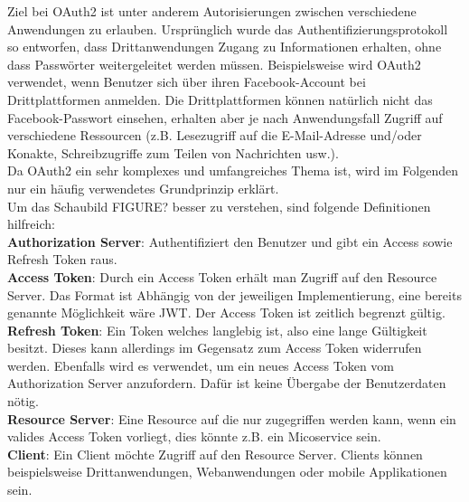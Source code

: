 Ziel bei OAuth2 ist unter anderem Autorisierungen zwischen verschiedene Anwendungen zu erlauben. Ursprünglich wurde das Authentifizierungsprotokoll so entworfen, dass Drittanwendungen Zugang zu Informationen erhalten, ohne dass Passwörter weitergeleitet werden müssen.\cite{richardson2019mic_pattern}  Beispielsweise wird OAuth2 verwendet, wenn Benutzer sich über ihren Facebook-Account bei Drittplattformen anmelden. Die Drittplattformen können natürlich nicht das Facebook-Passwort einsehen, erhalten aber je nach Anwendungsfall Zugriff auf verschiedene Ressourcen (z.B. Lesezugriff auf die E-Mail-Adresse und/oder Konakte, Schreibzugriffe zum Teilen von Nachrichten usw.). \\

Da OAuth2 ein sehr komplexes und umfangreiches Thema ist, wird im Folgenden nur ein häufig verwendetes Grundprinzip erklärt. \\

Um das Schaubild FIGURE? besser zu verstehen, sind folgende Definitionen hilfreich:\cite{richardson2019mic_pattern}\\

\textbf{Authorization Server}: Authentifiziert den Benutzer und gibt ein Access sowie Refresh Token raus.\\

\textbf{Access Token}: Durch ein Access Token erhält man Zugriff auf den Resource Server. Das Format ist Abhängig von der jeweiligen Implementierung, eine bereits genannte Möglichkeit wäre JWT. Der Access Token ist zeitlich begrenzt gültig. \\

\textbf{Refresh Token}: Ein Token welches langlebig ist, also eine lange Gültigkeit besitzt. Dieses kann allerdings im Gegensatz zum Access Token widerrufen werden. Ebenfalls wird es verwendet, um ein neues Access Token vom Authorization Server anzufordern. Dafür ist keine Übergabe der Benutzerdaten nötig.\\ 

\textbf{Resource Server}: Eine Resource auf die nur zugegriffen werden kann, wenn ein valides Access Token vorliegt, dies könnte z.B. ein Micoservice sein.\\ 

\textbf{Client}: Ein Client möchte Zugriff auf den Resource Server. Clients können beispielsweise Drittanwendungen, Webanwendungen oder mobile Applikationen sein.  \\ 



